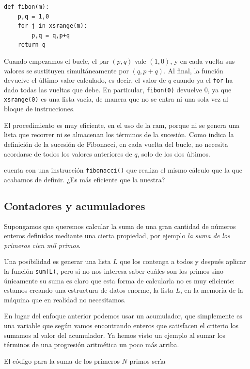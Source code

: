 \begin{enumerate}
\begin{lstlisting}
def fibon(m):
    p,q = 1,0
    for j in xsrange(m):
        p,q = q,p+q
    return q
\end{lstlisting}
\label{fiboi}
Cuando empezamos el bucle, el par $(p,q)$ vale $(1,0)$, y en cada vuelta sus
valores se sustituyen simultáneamente por $(q,p+q)$. Al final, la función
devuelve el
último valor calculado, es decir, el valor de $q$ cuando ya el \lstinline|for|
ha dado
todas las vueltas que debe. En particular, \lstinline|fibon(0)| devuelve $0$, ya
que
\lstinline|xsrange(0)| es una lista vacía, de manera que no se entra ni una sola
vez al
bloque de instrucciones.

El procedimiento es muy eficiente, en el uso de la {\sc ram}, porque ni se
genera una
lista que recorrer ni se almacenan los términos de la sucesión. Como indica la
definición
de la sucesión de Fibonacci, en cada vuelta del bucle, no necesita acordarse de
todos los
valores anteriores de $q$, solo de los dos últimos.

{\sage} cuenta con una instrucción \lstinline|fibonacci()| que realiza el mismo
cálculo  que la que acabamos de definir.  ¿Es más eficiente que la nuestra?

\end{enumerate}

\subsection{Contadores y acumuladores}\label{cont}
Supongamos que queremos calcular la suma de una gran cantidad de n\'umeros
enteros definidos mediante una cierta propiedad, por ejemplo {\itshape la suma
de los primeros cien mil primos}.

Una posibilidad es generar una lista $L$ que los
contenga a todos y despu\'es aplicar la funci\'on \lstinline|sum(L)|, pero si no
nos interesa saber cu\'ales son los primos sino \'unicamente su suma es claro
que esta forma de calcularla no es muy eficiente: estamos creando una estructura
de datos enorme, la lista $L$,  en la memoria de la m\'aquina que en realidad no
necesitamos. 


En lugar del enfoque anterior podemos usar un {\sc acumulador}, que simplemente
es una variable que seg\'un vamos encontrando enteros que satisfacen el criterio
los sumamos al valor del acumulador. Ya hemos visto un ejemplo al sumar los
t\'erminos de una progresi\'on aritm\'etica un poco m\'as arriba. 

El c\'odigo para la suma de los primeros $N$ primos ser\'{\i}a 

